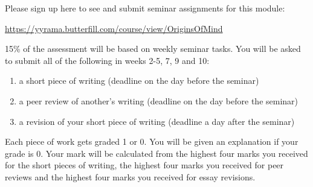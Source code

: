 \documentclass[12pt,\papersize]{extarticle}
\date{}
\begin{document}
\setlength\footnotesep{1em}





\maketitle

\setcounter{secnumdepth}{-1}


Please sign up here to see and submit seminar assignments for this module:

\url{https://yyrama.butterfill.com/course/view/OriginsOfMind}

15\% of the assessment will be based on weekly seminar tasks.  You will be asked to submit all of the following in weeks 2-5, 7, 9 and 10:
\begin{enumerate}
  \item a short piece of writing (deadline on the day before the seminar)
  \item a peer review of another’s writing (deadline on the day before the seminar)
  \item a revision of your short piece of writing (deadline a day after the seminar)

\end{enumerate}

Each piece of work gets graded 1 or 0.  You will be given an explanation if your grade is 0.  Your mark will be calculated from the highest four marks you received for the short pieces of writing, the highest four marks you received for peer reviews and the highest four marks you received for essay revisions.
\end{document}
